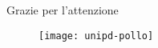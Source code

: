 %
\nonumber
\begin{frame}{Grazie per l'attenzione}
\begin{figure}[f]
\centering
    \texttt{[image: unipd-pollo]}
\end{figure}
\end{frame}
%
